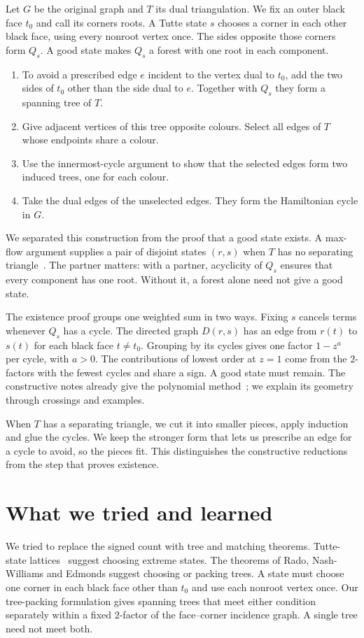 \documentclass[11pt,a4paper]{article}
\begin{document}
Let $G$ be the original graph and $T$ its dual triangulation. We fix an outer black face $t_0$ and call its corners roots. A Tutte state $s$ chooses a corner in each other black face, using every nonroot vertex once. The sides opposite those corners form $Q_s$. A good state makes $Q_s$ a forest with one root in each component.

\begin{enumerate}[leftmargin=1.5em,itemsep=3pt,topsep=3pt]
\item To avoid a prescribed edge $e$ incident to the vertex dual to $t_0$, add the two sides of $t_0$ other than the side dual to $e$. Together with $Q_s$ they form a spanning tree of $T$.
\item Give adjacent vertices of this tree opposite colours. Select all edges of $T$ whose endpoints share a colour.
\item Use the innermost-cycle argument to show that the selected edges form two induced trees, one for each colour.
\item Take the dual edges of the unselected edges. They form the Hamiltonian cycle in $G$.
\end{enumerate}

We separated this construction from the proof that a good state exists. A max-flow argument supplies a pair of disjoint states $(r,s)$ when $T$ has no separating triangle~\cite{OpenAI}. The partner matters: with a partner, acyclicity of $Q_s$ ensures that every component has one root. Without it, a forest alone need not give a good state.

The existence proof groups one weighted sum in two ways. Fixing $s$ cancels terms whenever $Q_s$ has a cycle. The directed graph $D(r,s)$ has an edge from $r(t)$ to $s(t)$ for each black face $t\ne t_0$. Grouping by its cycles gives one factor $1-z^{a}$ per cycle, with $a>0$. The contributions of lowest order at $z=1$ come from the $2$-factors with the fewest cycles and share a sign. A good state must remain. The constructive notes already give the polynomial method~\cite{Constructive}; we explain its geometry through crossings and examples.

When $T$ has a separating triangle, we cut it into smaller pieces, apply induction and glue the cycles. We keep the stronger form that lets us prescribe an edge for a cycle to avoid, so the pieces fit. This distinguishes the constructive reductions from the step that proves existence.

\section{What we tried and learned}
We tried to replace the signed count with tree and matching theorems. Tutte-state lattices~\cite{HineKalman} suggest choosing extreme states. The theorems of Rado, Nash-Williams and Edmonds suggest choosing or packing trees. A state must choose one corner in each black face other than $t_0$ and use each nonroot vertex once. Our tree-packing formulation gives spanning trees that meet either condition separately within a fixed $2$-factor of the face--corner incidence graph. A single tree need not meet both.
\end{document}

